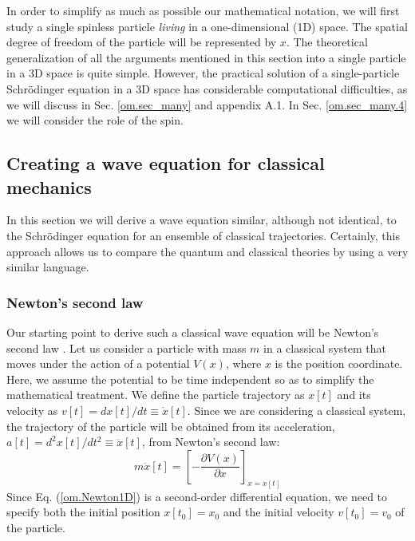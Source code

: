 \documentclass[onecolumn,nofootinbib, secnumarabic, amsmath, nobibnotes,11pt,aps,pra]{revtex4-1}
\newcommand{\sref}[1]{Sec. \ref{#1}}
\newcommand{\eref}[1]{Eq. (\ref{#1})}
\begin{document}
In order to simplify as much as possible our mathematical notation,
we will first study a single spinless particle \textit{living} in a
one-dimensional (1D) space. The spatial  degree of freedom of the particle will be represented by $x$. The theoretical generalization
of all the arguments mentioned in this section into a single
particle in a 3D space is quite simple. However, the practical
solution of a single-particle Schr\"odinger equation in a 3D space
has considerable computational difficulties, as we will discuss in
\sref{om.sec_many}
and appendix A.1. In \sref{om.sec_many.4} we will consider the
role of the spin.

\subsection{Creating a wave equation for classical mechanics}\label{om.sec.single_2}

In this section we will derive a wave equation similar, although not
identical, to the Schr\"odinger equation for an ensemble of
classical trajectories. Certainly, this approach allows us to
compare the quantum and classical theories by using a very similar
language.

\subsubsection{Newton's second law}

Our starting point to derive such a classical wave equation will be
Newton's second law \cite{om.Feynmann1963}. Let us consider a particle with
mass $m$ in a classical system that moves under the action of a
potential $V(x)$, where $x$ is the position coordinate. Here, we
assume the potential to be time independent so as to simplify the
mathematical treatment. We define the particle trajectory as $x[t]$
and its velocity as $v[t] = dx[t]/dt\equiv\dot{x}[t]$. Since we are
considering a classical system, the trajectory of the particle will
be obtained from its acceleration, $a[t] =
d^2x[t]/dt^2\equiv\ddot{x}[t]$, from Newton's second law:
\begin{equation} \label{om.Newton1D}
m \ddot{x}[t] = \left [-\frac{\partial V(x)}{\partial x} \right ] _{x = x[t]}
\end{equation}
Since \eref{om.Newton1D} is a second-order differential equation, we need to specify both the initial position $x[t_0] = x_0$ and the initial velocity $v[t_0] = v_0$ of the particle.
\end{document}
